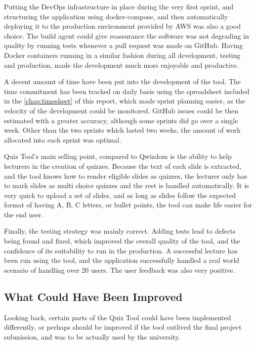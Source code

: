 Putting the DevOps infrastructure in place during the very first sprint, and structuring
the application using docker-compose, and then automatically deploying it to the
production environment provided by AWS was also a good choice. The build agent
could give reassurance the software was not degrading in quality by running tests
whenever a pull request was made on GitHub. Having Docker containers running in a
similar fashion during all development, testing and production, made the development
much more enjoyable and productive.

A decent amount of time have been put into the development of the tool. The time
commitment has been tracked on daily basis using the spreadsheet included in the
\autoref{chap:timesheet} of this report, which
made sprint planning easier, as the velocity of the development could be monitored.
GitHub issues could be then estimated with a greater accuracy, although some
sprints did go over a single week. Other than the two sprints which lasted two weeks,
the amount of work allocated into each sprint was optimal.

Quiz Tool's main selling point, compared to Qwizdom is the ability to help lecturers
in the creation of quizzes. Because the text of each slide is extracted, and the tool
knows how to render eligible slides as quizzes, the lecturer only has to mark
slides as multi choice quizzes and the rest is handled automatically. It is very quick
to upload a set of slides, and as long as slides follow the expected format of having
A, B, C letters, or bullet points, the tool can make life easier for the end user.

Finally, the testing strategy was mainly correct. Adding tests lead to defects being
found and fixed, which improved the overall quality of the tool, and the confidence
of its suitability to run in the production. A successful lecture has been run using
the tool, and the application successfully handled a real world scenario of handling
over 20 users. The user feedback was also very positive.

\subsection{What Could Have Been Improved}
Looking back, certain parts of the Quiz Tool could have been implemented differently,
or perhaps should be improved if the tool outlived the final project submission, and was
to be actually used by the university.

